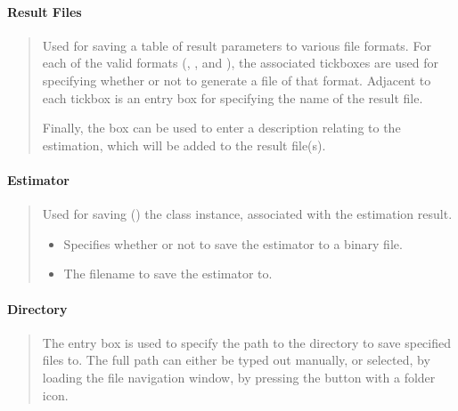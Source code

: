 \documentclass[letterpaper,10pt,english]{sphinxmanual}
\begin{document}
\paragraph{Result Files}
\label{\detokenize{gui/usage/result:result-files}}\begin{quote}

\sphinxAtStartPar
Used for saving a table of result parameters to various file formats.
For each of the valid formats (, , and ), the associated
tick\sphinxhyphen{}boxes are used for specifying whether or not to generate a file of that
format. Adjacent to each tick\sphinxhyphen{}box is an entry box for specifying the name of
the result file.

\sphinxAtStartPar
Finally, the  box can be used to enter a description relating
to the estimation, which will be added to the result file(s).
\end{quote}


\paragraph{Estimator}
\label{\detokenize{gui/usage/result:estimator}}\begin{quote}

\sphinxAtStartPar
Used for saving ()
the {\hyperref[\detokenize{references/core:nmrespy.core.Estimator}]{}} class instance, associated with the
estimation result.
\begin{itemize}
\item {} 
\sphinxAtStartPar
{} \sphinxhyphen{} Specifies whether or not to save the estimator to a
binary file.

\item {} 
\sphinxAtStartPar
{} \sphinxhyphen{} The filename to save the estimator to.

\end{itemize}
\end{quote}


\paragraph{Directory}
\label{\detokenize{gui/usage/result:directory}}\begin{quote}

\sphinxAtStartPar
The entry box is used to specify the path to the directory to save 
specified files to. The full path can either be typed out manually, or
selected, by loading the file navigation window, by pressing the button
with a folder icon.
\end{quote}
\end{document}
